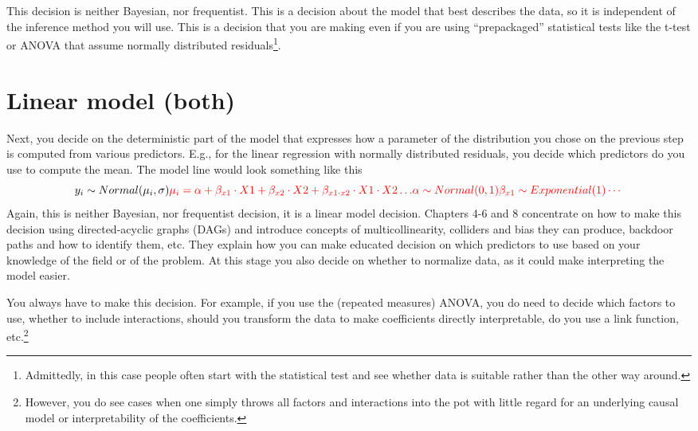 \documentclass[
]{book}
\begin{document}
This decision is neither Bayesian, nor frequentist. This is a decision about the model that best describes the data, so it is independent of the inference method you will use. This is a decision that you are making even if you are using ``prepackaged'' statistical tests like the t-test or ANOVA that assume normally distributed residuals\footnote{Admittedly, in this case people often start with the statistical test and see whether data is suitable rather than the other way around.}.

\hypertarget{linear-model-both}{%
\section{Linear model (both)}\label{linear-model-both}}

Next, you decide on the deterministic part of the model that expresses how a parameter of the distribution you chose on the previous step is computed from various predictors. E.g., for the linear regression with normally distributed residuals, you decide which predictors do you use to compute the mean. The model line would look something like this
\[
y_i \sim Normal(\mu_i, \sigma) \\
\color{red}{\mu_i = \alpha + \beta_{x1} \cdot X1 + \beta_{x2} \cdot X2 + \beta_{x1\cdot x2} \cdot X1 \cdot X2 \dotso} \\
\alpha \sim Normal(0, 1) \\
\beta_{x1} \sim Exponential(1) \\
\cdots
\]
Again, this is neither Bayesian, nor frequentist decision, it is a linear model decision. Chapters 4-6 and 8 concentrate on how to make this decision using directed-acyclic graphs (DAGs) and introduce concepts of multicollinearity, colliders and bias they can produce, backdoor paths and how to identify them, etc. They explain how you can make educated decision on which predictors to use based on your knowledge of the field or of the problem. At this stage you also decide on whether to normalize data, as it could make interpreting the model easier.

You always have to make this decision. For example, if you use the (repeated measures) ANOVA, you do need to decide which factors to use, whether to include interactions, should you transform the data to make coefficients directly interpretable, do you use a link function, etc.\footnote{However, you do see cases when one simply throws all factors and interactions into the pot with little regard for an underlying causal model or interpretability of the coefficients.}
\end{document}
